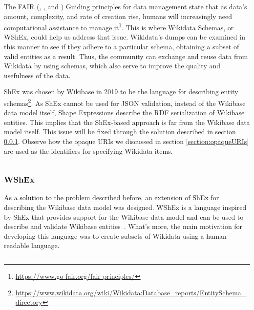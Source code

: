 The FAIR (, ,  and ) Guiding principles for data management state that as data's amount, complexity, and rate of creation rise, humans will increasingly need computational assistance to manage it\footnote{\url{https://www.go-fair.org/fair-principles/}}. This is where Wikidata Schemas, or WShEx, could help us address that issue. Wikidata's dumps can be examined in this manner to see if they adhere to a particular schema, obtaining a subset of valid entities as a result. Thus, the community can exchange and reuse data from Wikidata by using schemas, which also serve to improve the quality and usefulness of the data.

ShEx was chosen by Wikibase in 2019 to be the language for describing entity schemas\footnote{\url{https://www.wikidata.org/wiki/Wikidata:Database_reports/EntitySchema_directory}}. As ShEx cannot be used for JSON validation, instead of the Wikibase data model itself, Shape Expressions describe the RDF serialization of Wikibase entities. This implies that the ShEx-based approach is far from the Wikibase data model itself. This issue will be fixed through the solution described in section \ref{section:WShEx}. Observe how the opaque URIs we discussed in section \ref{section:opaqueURIs} are used as the identifiers for specifying Wikidata items.

\begin{code}
    \inputminted{shex}{code/listings/6-5_wikibase.shex}
\end{code}

\subsubsection{WShEx}
\label{section:WShEx}

As a solution to the problem described before, an extension of ShEx for describing the Wikibase data model was designed. WShEx is a language inspired by ShEx that provides support for the Wikibase data model and can be used to describe and validate Wikibase entities~\cite{https://doi.org/10.48550/arxiv.2208.02697}. What's more, the main motivation for developing this language was to create subsets of Wikidata using a human-readable language.

\begin{code}
    \inputminted{shex}{code/listings/6-6_wshex.shex}
\end{code}

